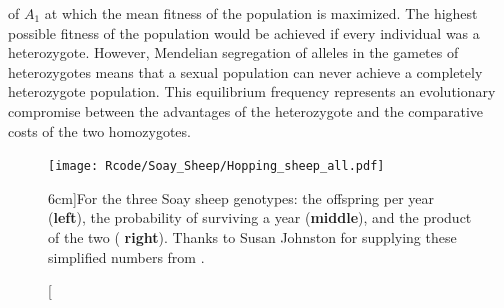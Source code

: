 of $A_1$ at which the mean fitness of the population is maximized. The
highest possible fitness of the population would be achieved if every
individual was a heterozygote. However, Mendelian segregation of alleles in the
gametes of heterozygotes means that a sexual population can never
achieve a completely heterozygote population. This equilibrium
frequency represents an evolutionary compromise between the advantages
of the heterozygote and the comparative costs of the two
homozygotes.\\



\begin{figure}
\begin{center}
  \texttt{[image: Rcode/Soay\_Sheep/Hopping\_sheep\_all.pdf]}
\end{center}
\caption[][6cm]{For the three Soay sheep genotypes: the offspring per year  ({\bf left}), the probability of
  surviving a year ({\bf middle}), and the product of the two ({\bf
    right}). Thanks to Susan Johnston for supplying these simplified
  numbers from \citet{johnston2013life}. 
} \label{fig:Soay_fitness}
\end{figure}


